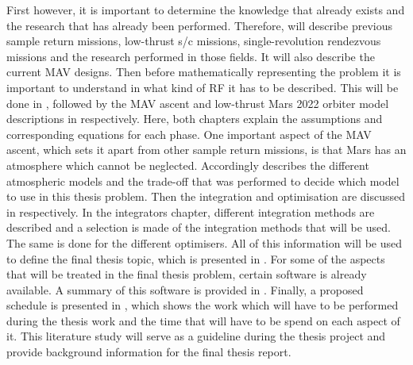 First however, it is important to determine the knowledge that already exists and the research that has already been performed. Therefore,  will describe previous sample return missions, low-thrust \ac{s/c} missions, single-revolution rendezvous missions and the research performed in those fields. It will also describe the current \ac{MAV} designs. Then before mathematically representing the problem it is important to understand in what kind of \ac{RF} it has to be described. This will be done in , followed by the \ac{MAV} ascent and low-thrust Mars 2022 orbiter model descriptions in  respectively. Here, both chapters explain the assumptions and corresponding equations for each phase. One important aspect of the \ac{MAV} ascent, which sets it apart from other sample return missions, is that Mars has an atmosphere which cannot be neglected. Accordingly  describes the different atmospheric models and the trade-off that was performed to decide which model to use in this thesis problem. Then the integration and optimisation are discussed in  respectively. In the integrators chapter, different integration methods are described and a selection is made of the integration methods that will be used. The same is done for the different optimisers. All of this information will be used to define the final thesis topic, which is presented in . For some of the aspects that will be treated in the final thesis problem, certain software is already available. A summary of this software is provided in . Finally, a proposed schedule is presented in , which shows the work which will have to be performed during the thesis work and the time that will have to be spend on each aspect of it. This literature study will serve as a guideline during the thesis project and provide background information for the final thesis report.

